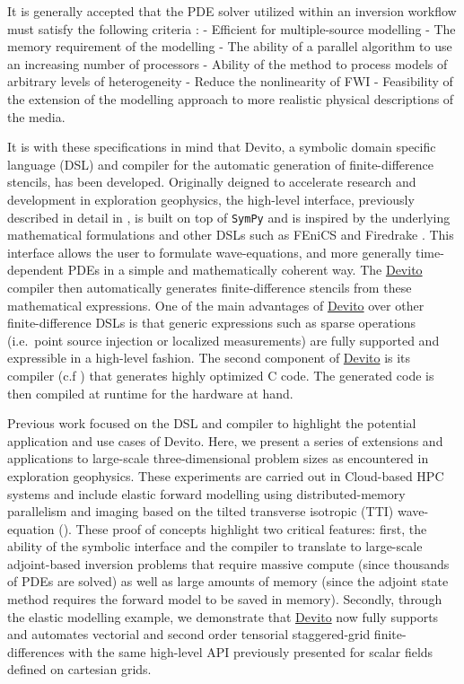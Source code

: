 \documentclass[10pt, conference]{IEEEtran}
\newcommand{\devito}{\href{https://github.com/devitocodes/devito}{Devito} }
\begin{document}
It is generally accepted that the PDE solver utilized within an
inversion workflow must satisfy the following criteria
\cite{virieuxmodelling}: - Efficient for multiple-source modelling - The
memory requirement of the modelling - The ability of a parallel algorithm
to use an increasing number of processors - Ability of the method to
process models of arbitrary levels of heterogeneity - Reduce the
nonlinearity of FWI - Feasibility of the extension of the modelling
approach to more realistic physical descriptions of the media.

It is with these specifications in mind that Devito, a symbolic domain
specific language (DSL) and compiler for the automatic generation of
finite-difference stencils, has been developed. Originally deigned to
accelerate research and development in exploration geophysics, the
high-level interface, previously described in detail in \cite{devito-api},
is built on top of \texttt{SymPy} \cite{sympy} and is inspired by the
underlying mathematical formulations and other DSLs such as FEniCS
\cite{fenics} and Firedrake \cite{firedrake}. This interface allows the
user to formulate wave-equations, and more generally time-dependent PDEs
in a simple and mathematically coherent way. The \devito compiler then
automatically generates finite-difference stencils from these mathematical
expressions. One of the main advantages of \devito over other
finite-difference DSLs is that generic expressions such as sparse
operations (i.e.~point source injection or localized measurements) are
fully supported and expressible in a high-level fashion. The second
component of \devito is its compiler (c.f \cite{devito-compiler}) that
generates highly optimized C code. The generated code is then compiled at
runtime for the hardware at hand.

Previous work focused on the DSL and compiler to highlight the potential
application and use cases of Devito. Here, we present a series of
extensions and applications to large-scale three-dimensional problem sizes
as encountered in exploration geophysics. These experiments are carried
out in Cloud-based HPC systems and include elastic forward modelling using
distributed-memory parallelism and imaging based on the tilted transverse
isotropic (TTI) wave-equation (\cite{virieux, thomsen1986, zhang-tti,
duveneck, louboutin2018segeow}).  These proof of concepts highlight two
critical features: first, the ability of the symbolic interface and the
compiler to translate to large-scale adjoint-based inversion problems that
require massive compute (since thousands of PDEs are solved) as well as
large amounts of memory (since the adjoint state method requires the
forward model to be saved in memory). Secondly, through the elastic
modelling example, we demonstrate that \devito now fully supports and
automates vectorial and second order tensorial staggered-grid
finite-differences with the same high-level API previously presented for
scalar fields defined on cartesian grids.
\end{document}
